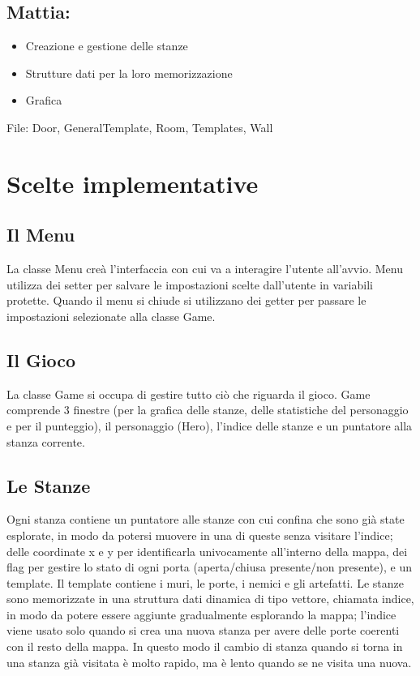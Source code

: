 \documentclass[12pt]{article}
\begin{document}
\subsection*{Mattia:}
\begin{itemize}
    \item Creazione e gestione delle stanze 
    \item Strutture dati per la loro memorizzazione
    \item Grafica
\end{itemize}
File: Door, GeneralTemplate, Room, Templates, Wall

\newpage
\section{Scelte implementative}
\subsection{Il Menu}
La classe Menu creà l'interfaccia con cui va a interagire l'utente all'avvio. Menu utilizza dei setter per salvare le impostazioni
scelte dall'utente in variabili protette. Quando il menu si chiude si utilizzano dei getter per passare le impostazioni selezionate
alla classe Game.

\subsection{Il Gioco}
La classe Game si occupa di gestire tutto ciò che riguarda il gioco.
Game comprende 3 finestre (per la grafica delle stanze, delle statistiche del personaggio e per il punteggio), 
il personaggio (Hero), l'indice delle stanze e un puntatore alla stanza corrente.

\subsection{Le Stanze}
Ogni stanza contiene un puntatore alle stanze con cui confina che sono già state esplorate, in modo da potersi muovere in una 
di queste senza visitare l'indice; delle coordinate x e y per identificarla univocamente all'interno della mappa, dei flag per
 gestire lo stato di ogni porta (aperta/chiusa presente/non presente), e un template. Il template contiene i muri, le porte, 
 i nemici e gli artefatti. \hfill\break
Le stanze sono memorizzate in una struttura dati dinamica di tipo vettore, chiamata indice, in modo da potere essere aggiunte gradualmente 
esplorando la mappa; l'indice viene usato solo quando si crea una nuova stanza per avere delle porte coerenti con il resto della mappa.
In questo modo il cambio di stanza quando si torna in una stanza già visitata è molto rapido, ma è lento quando se ne visita una nuova. 
\end{document}
